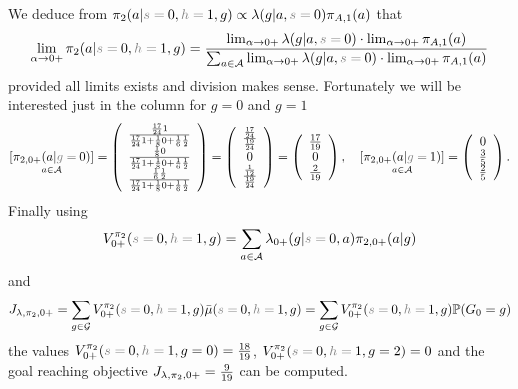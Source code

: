 \begin{example}
$$$$
We deduce from
$\pi_{2}(a|\subnote{s=}0,\subnote{h=}1,g) \propto \tkernel(g|a,\subnote{s=}0)
\pi_{A,1}(a)$ that 
$$
\lim_{\alpha \rightarrow 0+}\pi_{2}(a|\subnote{s=}0,\subnote{h=}1,g)
= \frac{ \lim_{\alpha \rightarrow 0+} \tkernel(g|a,\subnote{s=}0) \cdot  \lim_{\alpha \rightarrow 0+} \pi_{A,1}(a) }{ \sum_{a\in \mathcal{A}} \lim_{\alpha \rightarrow 0+} \tkernel(g|a,\subnote{s=}0) \cdot  \lim_{\alpha \rightarrow 0+} \pi_{A,1}(a)}
$$
provided all limits exists and division makes sense. Fortunately we will be interested
just in the column for $g=0$ and $g=1$
$$
\underset{a\in \mathcal{A}}{[\pi_{2,0+}(a|\subnote{g=}0)]} = \left(
\begin{array}{c}
\frac{\frac{17}{24}1}{\frac{17}{24}1 + \frac{1}{8}0 + \frac{1}{6}\frac{1}{2} }
\\
\frac{\frac{1}{8}0}{\frac{17}{24}1 + \frac{1}{8}0 + \frac{1}{6}\frac{1}{2} }
\\
\frac{\frac{1}{6}\frac{1}{2}}{\frac{17}{24}1 + \frac{1}{8}0 + \frac{1}{6}\frac{1}{2}}
\end{array}
\right)
=
\left(
\begin{array}{c}
\frac{\frac{17}{24}}{\frac{19}{24}}
\\
0 
\\
\frac{\frac{1}{12}}{\frac{19}{24}}
\end{array}
\right)
=
\left(
\begin{array}{c}
\frac{17}{19}
\\
0 
\\
\frac{2}{19}
\end{array}
\right)
,
\quad
\underset{a\in \mathcal{A}}{[\pi_{2,0+}(a|\subnote{g=}1)]} = \left(
\begin{array}{c}
0
\\
\frac{3}{5}
\\
\frac{2}{5}
\end{array}
\right).
$$
Finally using 
$$
V_{0+}^{\pi_2}(\subnote{s=}0,\subnote{h=}1,g) = \sum_{a\in \mathcal{A}}\tkernel_{0+}(g|\subnote{s=}0,a) \pi_{2,0+}(a|g)$$
and
$$J_{\tkernel,\pi_{2},0+} = \sum_{g\in \mathcal{G}} V_{0+}^{\pi_2}(\subnote{s=}0,\subnote{h=}1,g) \bar{\mu}(\subnote{s=}0,\subnote{h=}1,g) =
\sum_{g\in \mathcal{G}}
V_{0+}^{\pi_2}(\subnote{s=}0,\subnote{h=}1,g) \prob(G_0=g)
$$
the values
$V_{0+}^{\pi_2}(\subnote{s=}0,\subnote{h=}1,g=0) = \frac{18}{19}$, $V_{0+}^{\pi_2}(\subnote{s=}0,\subnote{h=}1,g=2) = 0$ and the goal reaching objective
$J_{\mathit{\lambda},\pi_{2},0+}= \frac{9}{19}$ can be computed.


\end{example}
